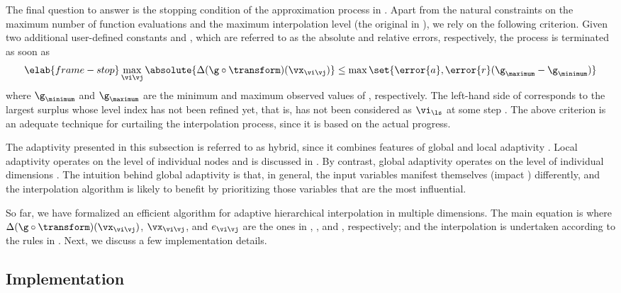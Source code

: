 The final question to answer is the stopping condition of the approximation
process in . Apart from the natural constraints on the
maximum number of function evaluations and the maximum interpolation level (the
original \ls in ), we rely on the following
criterion. Given two additional user-defined constants  and ,
which are referred to as the absolute and relative errors, respectively, the
process is terminated as soon as
\begin{equation} \elab{frame-stop}
  \max_{\vi \vj} \absolute{\Delta(\g \circ \transform)(\vx_{\vi \vj})} \leq \max \set{\error{a}, \error{r} (\g_\maximum - \g_\minimum)}
\end{equation}
where $\g_\minimum$ and $\g_\maximum$ are the minimum and maximum observed
values of \g, respectively. The left-hand side of  corresponds
to the largest surplus whose level index has not been refined yet, that is, has
not been considered as $\vi_{\ls}$ at some step \ls. The above criterion is an
adequate technique for curtailing the interpolation process, since it is based
on the actual progress.

The adaptivity presented in this subsection is referred to as hybrid, since it
combines features of global and local adaptivity \cite{jakeman2012}. Local
adaptivity operates on the level of individual nodes \cite{ma2009} and is
discussed in . By contrast, global adaptivity operates on
the level of individual dimensions \cite{klimke2006}. The intuition behind
global adaptivity is that, in general, the input variables manifest themselves
(impact \g) differently, and the interpolation algorithm is likely to benefit by
prioritizing those variables that are the most influential.

\conclusioncut
So far, we have formalized an efficient algorithm for adaptive hierarchical
interpolation in multiple dimensions. The main equation is
 where $\Delta(\g \circ \transform)(\vx_{\vi \vj})$,
$\vx_{\vi \vj}$, and $e_{\vi \vj}$ are the ones in
, , and ,
respectively; and the interpolation is undertaken according to the rules in
. Next, we discuss a few implementation details.

\subsection{Implementation}


